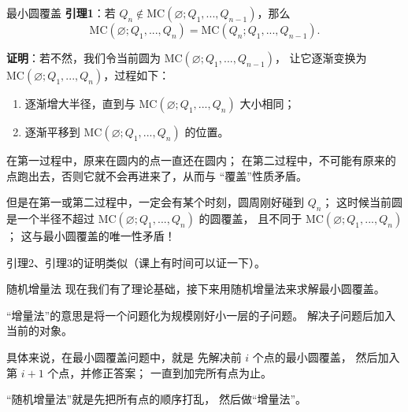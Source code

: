 \documentclass{beamer}
\begin{document}
\begin{frame}{最小圆覆盖}
    \footnotesize
    \textbf{引理1}：若 $Q_n\notin \text{MC}(\varnothing;Q_1,...,Q_{n-1})$，那么
    \begin{equation*}
        \text{MC}(\varnothing;Q_1,...,Q_{n})=\text{MC}(Q_n;Q_1,...,Q_{n-1}).
    \end{equation*}

    \vspace{1em}
    \textbf{证明}：若不然，我们令当前圆为 $\text{MC}(\varnothing;Q_1,...,Q_{n-1})$，
    让它逐渐变换为 $\text{MC}(\varnothing;Q_1,...,Q_{n})$，过程如下：
    \begin{enumerate}
        \item 逐渐增大半径，直到与 $\text{MC}(\varnothing;Q_1,...,Q_{n})$ 大小相同；
        \item 逐渐平移到 $\text{MC}(\varnothing;Q_1,...,Q_{n})$ 的位置。
    \end{enumerate} 

    \pause 在第一过程中，原来在圆内的点一直还在圆内；
    在第二过程中，不可能有原来的点跑出去，否则它就不会再进来了，从而与
    “覆盖”性质矛盾。

    \pause 但是在第一或第二过程中，一定会有某个时刻，圆周刚好碰到 $Q_n$；
    这时候当前圆是一个半径不超过 $\text{MC}(\varnothing;Q_1,...,Q_{n})$ 的圆覆盖，
    且不同于 $\text{MC}(\varnothing;Q_1,...,Q_{n})$；
    这与最小圆覆盖的唯一性矛盾！

    \vspace{1em}
    引理2、引理3的证明类似（课上有时间可以证一下）。
\end{frame}

\begin{frame}{随机增量法}
    \small
    现在我们有了理论基础，接下来用随机增量法来求解最小圆覆盖。

    \vspace{1em}\pause
    “增量法”的意思是将一个问题化为规模刚好小一层的子问题。
    解决子问题后加入当前的对象。

    \vspace{1em}\pause
    具体来说，在最小圆覆盖问题中，就是
    先解决前 $i$ 个点的最小圆覆盖，
    然后加入第 $i+1$ 个点，并修正答案；
    一直到加完所有点为止。

    \vspace{1em}\pause
    “随机增量法”就是先把所有点的顺序打乱，
    然后做“增量法”。
\end{frame}
\end{document}
